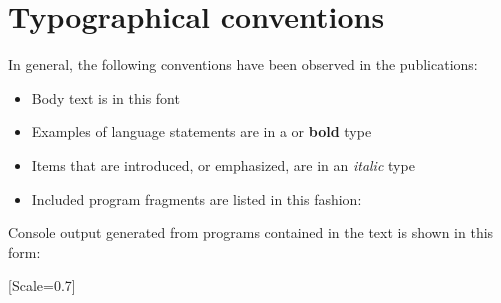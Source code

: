 \chapter{Typographical conventions}
In general, the following conventions have been observed in the \crexx{} publications:
\begin{itemize}
\item Body text is in this font
\item Examples of language statements are in a  or \textbf{bold} type
\item Items that are introduced, or emphasized, are in an \emph{italic} type
\item Included program fragments are listed in this fashion:
  
\end{itemize}

Console output generated from programs contained in the text is shown in this form:

\begin{terminaloutput} [Scale=0.7] \obeylines \parskip=0pt \parindent=0pt  \end{terminaloutput}

